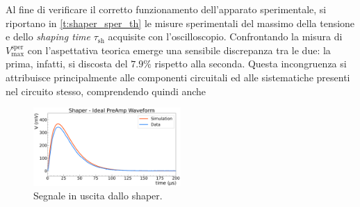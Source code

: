 \documentclass[a4paper,11pt]{article} %
\begin{document}
Al fine di verificare il corretto funzionamento dell'apparato sperimentale, si riportano in \autoref{t:shaper_sper_th}
le misure sperimentali del massimo della tensione e dello \textit{shaping time} $\tau_{\text{sh}}$ acquisite con
l'oscilloscopio. Confrontando la misura di $V_{\text{max}}^{\text{sper}}$ con l'aspettativa teorica emerge una sensibile
discrepanza tra le due: la prima, infatti, si discosta del $7.9\%$ rispetto alla seconda. Questa incongruenza si
attribuisce principalmente alle componenti circuitali ed alle sistematiche presenti nel circuito stesso, comprendendo
quindi anche

\begin{figure} 
	\centering 
	\includegraphics[width=0.5\textwidth]{../Plots/Shaper/shaper_ideal.png}
   \caption{\small Segnale in uscita dallo shaper.} 
   \label{i:shaper_ideal} 
\end{figure}
\end{document}
